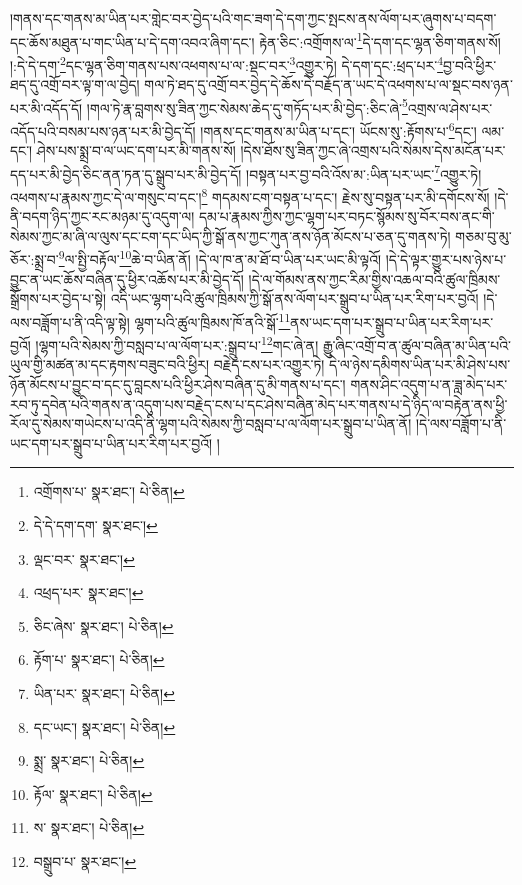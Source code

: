 །གནས་དང་གནས་མ་ཡིན་པར་གླེང་བར་བྱེད་པའི་གང་ཟག་དེ་དག་ཀྱང་སྤངས་ནས་ལོག་པར་ཞུགས་པ་བདག་དང་ཆོས་མཐུན་པ་གང་ཡིན་པ་དེ་དག་འབའ་ཞིག་དང་། རྟེན་ཅིང་:འགྲོགས་ལ་\footnote{འགྲོགས་པ་  སྣར་ཐང་།  པེ་ཅིན། }དེ་དག་དང་ལྷན་ཅིག་གནས་སོ། །:དེ་དེ་དག་\footnote{དེ་དེ་དག་དག་  སྣར་ཐང་། }དང་ལྷན་ཅིག་གནས་པས་འཕགས་པ་ལ་:སྡང་བར་\footnote{ལྡང་བར་  སྣར་ཐང་། }འགྱུར་ཏེ། དེ་དག་དང་:ཕྲད་པར་\footnote{འཕྲད་པར་  སྣར་ཐང་། }བྱ་བའི་ཕྱིར་ཐད་དུ་འགྲོ་བར་ལྟ་ག་ལ་བྱེད། གལ་ཏེ་ཐད་དུ་འགྲོ་བར་བྱེད་དེ་ཆོས་དེ་བརྗོད་ན་ཡང་དེ་འཕགས་པ་ལ་སྡང་བས་ཉན་པར་མི་འདོད་དོ། །གལ་ཏེ་རྣ་བླགས་སུ་ཟིན་ཀྱང་སེམས་ཆེད་དུ་གཏོད་པར་མི་བྱེད་:ཅིང་ཞེ་\footnote{ཅིང་ཞེས་  སྣར་ཐང་།  པེ་ཅིན། }འགྲས་ལ་ཤེས་པར་འདོད་པའི་བསམ་པས་ཉན་པར་མི་བྱེད་དོ། །གནས་དང་གནས་མ་ཡིན་པ་དང་། ཡོངས་སུ་:རྟོགས་པ་\footnote{རྟོག་པ་  སྣར་ཐང་།  པེ་ཅིན། }དང་། ལམ་དང་། ཤེས་པས་སྨྲ་བ་ལ་ཡང་དག་པར་མི་གནས་སོ། །དེས་ཐོས་སུ་ཟིན་ཀྱང་ཞེ་འགྲས་པའི་སེམས་དེས་མངོན་པར་དད་པར་མི་བྱེད་ཅིང་ནན་ཏན་དུ་སྒྲུབ་པར་མི་བྱེད་དོ། །བསྟན་པར་བྱ་བའི་འོས་མ་:ཡིན་པར་ཡང་\footnote{ཡིན་པར་  སྣར་ཐང་།  པེ་ཅིན། }འགྱུར་ཏེ། འཕགས་པ་རྣམས་ཀྱང་དེ་ལ་གསུང་བ་དང་།\footnote{དང་ཡང་།  སྣར་ཐང་།  པེ་ཅིན། } གདམས་ངག་བསྟན་པ་དང་། རྗེས་སུ་བསྟན་པར་མི་དགོངས་སོ། །དེ་ནི་བདག་ཉིད་ཀྱང་རང་མཉམ་དུ་འདུག་ལ། དམ་པ་རྣམས་ཀྱིས་ཀྱང་ལྷག་པར་བཏང་སྙོམས་སུ་བོར་བས་ནང་གི་སེམས་ཀྱང་མ་ཞི་ལ་ལུས་དང་ངག་དང་ཡིད་ཀྱི་སྒོ་ནས་ཀྱང་ཀུན་ནས་ཉོན་མོངས་པ་ཅན་དུ་གནས་ཏེ། གཅམ་བུ་མུ་ཅོར་:སྨྲ་བ་\footnote{སྨྲ་  སྣར་ཐང་།  པེ་ཅིན། }ལ་སྤྱི་བརྟོལ་\footnote{རྟོལ་  སྣར་ཐང་།  པེ་ཅིན། }ཆེ་བ་ཡིན་ནོ། །དེ་ལ་ཁ་ན་མ་ཐོ་བ་ཡིན་པར་ཡང་མི་ལྟའོ། །དེ་དེ་ལྟར་གྱུར་པས་ཉེས་པ་བྱུང་ན་ཡང་ཆོས་བཞིན་དུ་ཕྱིར་འཆོས་པར་མི་བྱེད་དོ། །དེ་ལ་གོམས་ནས་ཀྱང་རིམ་གྱིས་འཆལ་བའི་ཚུལ་ཁྲིམས་སྒྲོགས་པར་བྱེད་པ་སྟེ། འདི་ཡང་ལྷག་པའི་ཚུལ་ཁྲིམས་ཀྱི་སྒོ་ནས་ལོག་པར་སྒྲུབ་པ་ཡིན་པར་རིག་པར་བྱའོ། །དེ་ལས་བཟློག་པ་ནི་འདི་ལྟ་སྟེ། ལྷག་པའི་ཚུལ་ཁྲིམས་ཁོ་ནའི་སྒོ་\footnote{ས་  སྣར་ཐང་།  པེ་ཅིན། }ནས་ཡང་དག་པར་སྒྲུབ་པ་ཡིན་པར་རིག་པར་བྱའོ། །ལྷག་པའི་སེམས་ཀྱི་བསླབ་པ་ལ་ལོག་པར་:སྒྲུབ་པ་\footnote{བསྒྲུབ་པ་  སྣར་ཐང་། }གང་ཞེ་ན། རྒྱུ་ཞིང་འགྲོ་བ་ན་ཚུལ་བཞིན་མ་ཡིན་པའི་ཡུལ་གྱི་མཚན་མ་དང་རྟགས་བཟུང་བའི་ཕྱིར། བརྗེད་ངས་པར་འགྱུར་ཏེ། དེ་ལ་ཉེས་དམིགས་ཡིན་པར་མི་ཤེས་པས་ཉོན་མོངས་པ་བྱུང་བ་དང་དུ་བླངས་པའི་ཕྱིར་ཤེས་བཞིན་དུ་མི་གནས་པ་དང་། གནས་ཤིང་འདུག་པ་ན་ཟླ་མེད་པར་རབ་ཏུ་དབེན་པའི་གནས་ན་འདུག་པས་བརྗེད་ངས་པ་དང་ཤེས་བཞིན་མེད་པར་གནས་པ་དེ་ཉིད་ལ་བརྟེན་ནས་ཕྱི་རོལ་དུ་སེམས་གཡེངས་པ་འདི་ནི་ལྷག་པའི་སེམས་ཀྱི་བསླབ་པ་ལ་ལོག་པར་སྒྲུབ་པ་ཡིན་ནོ། །དེ་ལས་བཟློག་པ་ནི་ཡང་དག་པར་སྒྲུབ་པ་ཡིན་པར་རིག་པར་བྱའོ། །
